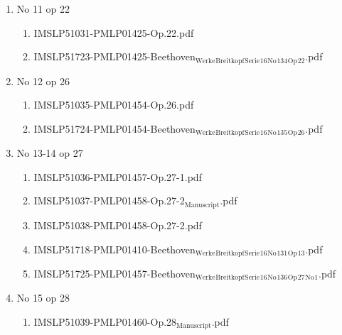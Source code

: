 \documentclass[11pt]{article}
\begin{document}
\begin{enumerate}
\begin{enumerate}
\begin{enumerate}
\item No 11 op 22
\label{sec-1-1-1-1-44-9-6-8-52}
\begin{enumerate}
\item IMSLP51031-PMLP01425-Op.22.pdf
\label{sec-1-1-1-1-44-9-6-8-52-1}

\item IMSLP51723-PMLP01425-Beethoven$_{\text{Werke}}$$_{\text{Breitkopf}}$$_{\text{Serie}}$$_{\text{16}}$$_{\text{No}}$$_{\text{134}}$$_{\text{Op}}$$_{\text{22}}$.pdf
\label{sec-1-1-1-1-44-9-6-8-52-2}
\end{enumerate}

\item No 12 op 26
\label{sec-1-1-1-1-44-9-6-8-53}
\begin{enumerate}
\item IMSLP51035-PMLP01454-Op.26.pdf
\label{sec-1-1-1-1-44-9-6-8-53-1}

\item IMSLP51724-PMLP01454-Beethoven$_{\text{Werke}}$$_{\text{Breitkopf}}$$_{\text{Serie}}$$_{\text{16}}$$_{\text{No}}$$_{\text{135}}$$_{\text{Op}}$$_{\text{26}}$.pdf
\label{sec-1-1-1-1-44-9-6-8-53-2}
\end{enumerate}

\item No 13-14 op 27
\label{sec-1-1-1-1-44-9-6-8-54}
\begin{enumerate}
\item IMSLP51036-PMLP01457-Op.27-1.pdf
\label{sec-1-1-1-1-44-9-6-8-54-1}

\item IMSLP51037-PMLP01458-Op.27-2$_{\text{Manuscript}}$.pdf
\label{sec-1-1-1-1-44-9-6-8-54-2}

\item IMSLP51038-PMLP01458-Op.27-2.pdf
\label{sec-1-1-1-1-44-9-6-8-54-3}

\item IMSLP51718-PMLP01410-Beethoven$_{\text{Werke}}$$_{\text{Breitkopf}}$$_{\text{Serie}}$$_{\text{16}}$$_{\text{No}}$$_{\text{131}}$$_{\text{Op}}$$_{\text{13}}$.pdf
\label{sec-1-1-1-1-44-9-6-8-54-4}

\item IMSLP51725-PMLP01457-Beethoven$_{\text{Werke}}$$_{\text{Breitkopf}}$$_{\text{Serie}}$$_{\text{16}}$$_{\text{No}}$$_{\text{136}}$$_{\text{Op}}$$_{\text{27}}$$_{\text{No}}$$_{\text{1}}$.pdf
\label{sec-1-1-1-1-44-9-6-8-54-5}
\end{enumerate}

\item No 15 op 28
\label{sec-1-1-1-1-44-9-6-8-55}
\begin{enumerate}
\item IMSLP51039-PMLP01460-Op.28$_{\text{Manuscript}}$.pdf
\label{sec-1-1-1-1-44-9-6-8-55-1}


\end{enumerate}
\end{enumerate}
\end{enumerate}
\end{enumerate}
\end{document}
